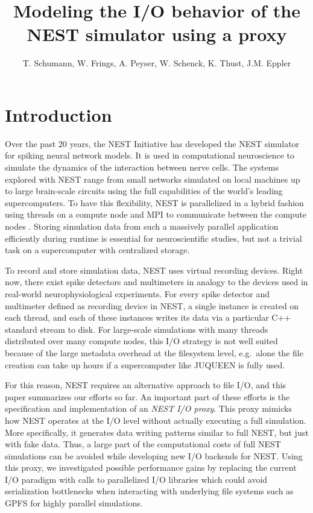 \documentclass[]{YIC2015}
\title{Modeling the I/O behavior of the NEST simulator using a proxy}
\author[T. Schumann et al.]{%
  T. Schumann\authref{a}\corref,
  W. Frings\authref{b},
  A. Peyser\authref{c},
  W. Schenck\authref{c},
  K. Thust\authref{b},
  J.M. Eppler\authref{c}
}
\begin{document}
\maketitle

\section{Introduction}
%
Over the past 20 years, the NEST Initiative \cite{NESTInitiative} has
developed the NEST \cite{NEST} simulator for spiking neural network
models. It is used in computational neuroscience to simulate the
dynamics of the interaction between nerve cells. The systems explored
with NEST range from small networks simulated on local machines up to
large brain-scale circuits using the full capabilities of the world's
leading supercomputers. To have this flexibility, NEST is parallelized
in a hybrid fashion using threads on a compute node and MPI to
communicate between the compute nodes \cite{Plesser07}.  Storing
simulation data from such a massively parallel application efficiently
during runtime is essential for neuroscientific studies, but not a
trivial task on a supercomputer with centralized storage.

To record and store simulation data, NEST uses virtual recording devices. Right
now, there exist spike detectors and multimeters in analogy to the devices used
in real-world neurophysiological experiments. For every spike detector and
multimeter defined as recording device in NEST, a single instance is created on
each thread, and each of these instances writes its data via a particular C++
standard stream to disk. For large-scale simulations with many threads
distributed over many compute nodes, this I/O strategy is not well suited
because of the large metadata overhead at the filesystem level, e.g.~alone the
file creation can take up hours if a supercomputer like JUQUEEN is fully used.

For this reason, NEST requires an alternative approach to file I/O, and this
paper summarizes our efforts so far. An important part of these efforts is the
specification and implementation of an \emph{NEST I/O proxy}. This proxy mimicks
how NEST operates at the I/O level without actually executing a full simulation.
More specifically, it generates data writing patterns similar to full NEST, but
just with fake data. Thus, a large part of the computational costs of full NEST
simulations can be avoided while developing new I/O backends for NEST. Using
this proxy, we investigated possible performance gains by replacing the current
I/O paradigm with calls to parallelized I/O libraries which could avoid
serialization bottlenecks when interacting with underlying file systems such as
GPFS \cite{GPFS} for highly parallel simulations.
\end{document}
